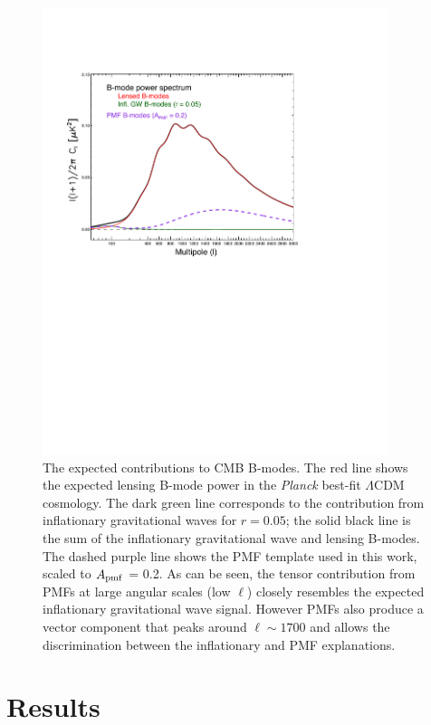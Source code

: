 \documentclass[preprint]{emulateapj}
\newcommand{\apmf}{\ensuremath{A_{\rm pmf}}}
\newcommand{\lcdm}{\ensuremath{\Lambda}CDM}
\newcommand{\planck}{{\sl Planck}}
\begin{document}
\begin{figure}[htb]\centering
\includegraphics[width=0.9\textwidth,clip,trim={1.5cm 12.cm 5cm 4cm}]{pmf_templates.pdf}
  \caption[CMB polarization from PMFs]{
  The expected contributions to CMB B-modes. 
  The red line shows the expected lensing B-mode power in the \planck{} best-fit \lcdm{} cosmology. 
  The dark green line corresponds to the contribution from inflationary gravitational waves for $r=0.05$; the solid black line is the sum of the inflationary gravitational wave and lensing B-modes. 
  The dashed purple line shows the PMF template used in this work, scaled to \apmf{} = 0.2. 
  As can be seen, the tensor contribution from PMFs at large angular scales (low $\ell$) closely resembles the expected inflationary gravitational wave signal. 
  However PMFs also produce a vector component that peaks around $\ell \sim 1700$ and allows the discrimination between  the inflationary and PMF explanations. 
      \label{fig:pmf-bb}
  }
\end{figure}
 
\section{Results}
\label{sec:results}
\end{document}
